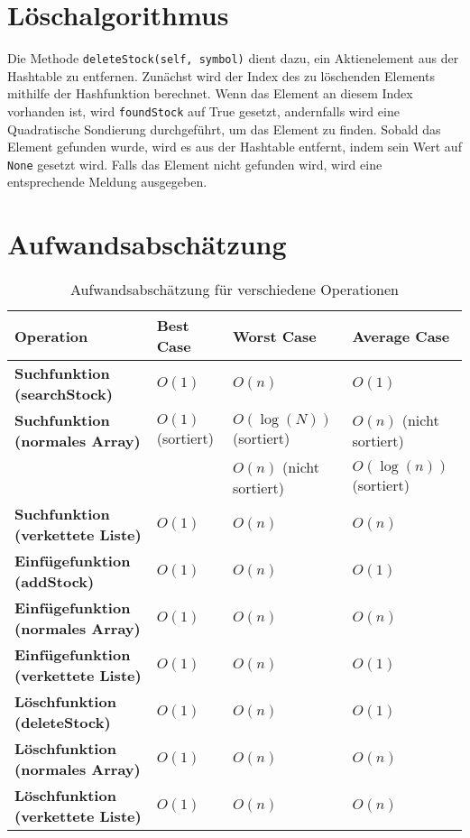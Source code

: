 \documentclass{article}
\begin{document}
\section*{Löschalgorithmus}
Die Methode \texttt{deleteStock(self, symbol)} dient dazu, ein Aktienelement aus der Hashtable zu entfernen. Zunächst wird der Index des zu löschenden Elements mithilfe der Hashfunktion 
berechnet. Wenn das Element an diesem Index vorhanden ist, wird \texttt{foundStock} auf True gesetzt, andernfalls wird eine Quadratische Sondierung durchgeführt, um das Element zu finden. 
Sobald das Element gefunden wurde, wird es aus der Hashtable entfernt, indem sein Wert auf \texttt{None} gesetzt wird. Falls das Element nicht gefunden wird, wird eine entsprechende Meldung ausgegeben.

\section*{Aufwandsabschätzung}

\begin{table}[h]
    \centering
    \begin{tabular}{|l|l|l|l|}
    \hline
    \textbf{Operation}      & \textbf{Best Case} & \textbf{Worst Case} & \textbf{Average Case} \\ \hline
    \textbf{Suchfunktion (searchStock)} & $O(1)$              & $O(n)$              & $O(1)$                \\ \hline
    \textbf{Suchfunktion (normales Array)} & $O(1)$ (sortiert)    & $O(\log(N))$ (sortiert)   & $O(n)$ (nicht sortiert) \\
                                       &  & $O(n)$ (nicht sortiert) & $O(\log(n))$ (sortiert)   \\ \hline
    \textbf{Suchfunktion (verkettete Liste)} & $O(1)$              & $O(n)$              & $O(n)$                \\ \hline
    \textbf{Einfügefunktion (addStock)} & $O(1)$              & $O(n)$              & $O(1)$                \\ \hline
    \textbf{Einfügefunktion (normales Array)} & $O(1)$              & $O(n)$              & $O(n)$                \\ \hline
    \textbf{Einfügefunktion (verkettete Liste)} & $O(1)$              & $O(n)$              & $O(1)$                \\ \hline
    \textbf{Löschfunktion (deleteStock)} & $O(1)$              & $O(n)$              & $O(1)$                \\ \hline
    \textbf{Löschfunktion (normales Array)} & $O(1)$              & $O(n)$              & $O(n)$                \\ \hline
    \textbf{Löschfunktion (verkettete Liste)} & $O(1)$              & $O(n)$              & $O(n)$                \\ \hline
    \end{tabular}
    \caption{Aufwandsabschätzung für verschiedene Operationen}
    \label{tab:aufwandsabschaetzung}
    \end{table}
\end{document}
